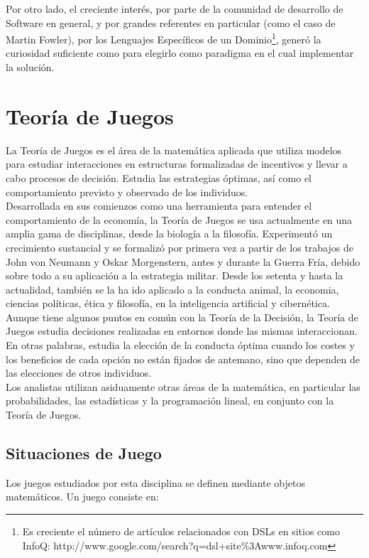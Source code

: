 \documentclass[10pt]{article}
\numberwithin{equation}{section}
\numberwithin{figure}{section}
\numberwithin{table}{section}
\begin{document}
Por otro lado, el creciente interés, por parte de la comunidad de desarrollo de Software en general, y por grandes referentes en particular (como el caso de Martin Fowler\cite{Fow:01}), por los Lenguajes Específicos de un Dominio\footnote{Es creciente el número de artículos relacionados con DSLs en sitios como InfoQ: http://www.google.com/search?q=dsl+site\%3Awww.infoq.com}, generó la curiosidad suficiente como para elegirlo como paradigma en el cual implementar la solución.

\newpage
\section{Teoría de Juegos}\label{juegos}
La Teoría de Juegos es el área de la matemática aplicada que utiliza modelos para estudiar interacciones en estructuras formalizadas de incentivos y llevar a cabo procesos de decisión. Estudia las estrategias óptimas, así como el comportamiento previsto y observado de los individuos.\\

Desarrollada en sus comienzos como una herramienta para entender el comportamiento de la economía, la Teoría de Juegos se usa actualmente en una amplia gama de disciplinas, desde la biología a la filosofía. Experimentó un crecimiento sustancial y se formalizó por primera vez a partir de los trabajos de John von Neumann y Oskar Morgenstern, antes y durante la Guerra Fría, debido sobre todo a su aplicación a la estrategia militar. Desde los setenta y hasta la actualidad, también se la ha ido aplicado a la conducta animal, la  economia, ciencias políticas, ética y filosofía, en la inteligencia artificial y cibernética.\\

Aunque tiene algunos puntos en común con la Teoría de la Decisión, la Teoría de Juegos estudia decisiones realizadas en entornos donde las mismas interaccionan. En otras palabras, estudia la elección de la conducta óptima cuando los costes y los beneficios de cada opción no están fijados de antemano, sino que dependen de las elecciones de otros individuos.\\

Los analistas utilizan asiduamente otras áreas de la matemática, en particular las probabilidades, las estadísticas y la programación lineal, en conjunto con la Teoría de Juegos.\cite{Wiki:01}

\subsection{Situaciones de Juego}
Los juegos estudiados por esta disciplina se definen mediante objetos matemáticos. Un juego consiste en:
\end{document}
